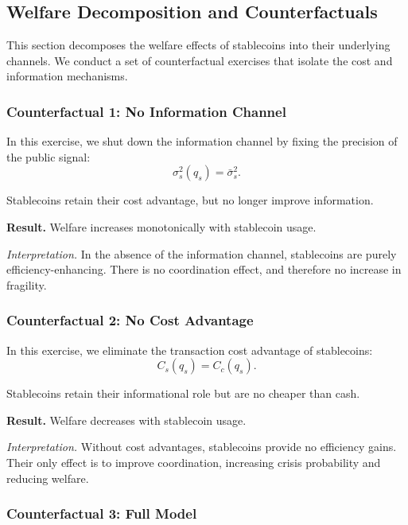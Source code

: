 \subsection{Welfare Decomposition and Counterfactuals}

This section decomposes the welfare effects of stablecoins into their underlying channels. We conduct a set of counterfactual exercises that isolate the cost and information mechanisms.

\subsubsection{Counterfactual 1: No Information Channel}

In this exercise, we shut down the information channel by fixing the precision of the public signal:
\begin{equation}
\sigma_s^2(q_s) = \bar{\sigma}_s^2.
\end{equation}

Stablecoins retain their cost advantage, but no longer improve information.

\textbf{Result.} Welfare increases monotonically with stablecoin usage.

\textit{Interpretation.} In the absence of the information channel, stablecoins are purely efficiency-enhancing. There is no coordination effect, and therefore no increase in fragility.

\subsubsection{Counterfactual 2: No Cost Advantage}

In this exercise, we eliminate the transaction cost advantage of stablecoins:
\begin{equation}
C_s(q_s) = C_c(q_s).
\end{equation}

Stablecoins retain their informational role but are no cheaper than cash.

\textbf{Result.} Welfare decreases with stablecoin usage.

\textit{Interpretation.} Without cost advantages, stablecoins provide no efficiency gains. Their only effect is to improve coordination, increasing crisis probability and reducing welfare.

\subsubsection{Counterfactual 3: Full Model}

